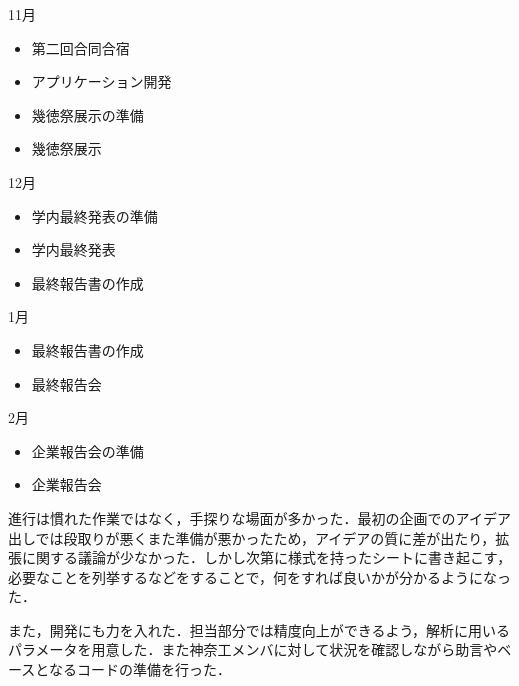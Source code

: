 11月
\begin{itemize}
\item 第二回合同合宿
\item アプリケーション開発
\item 幾徳祭展示の準備
\item 幾徳祭展示
\end{itemize}
12月
\begin{itemize}
\item 学内最終発表の準備
\item 学内最終発表
\item 最終報告書の作成
\end{itemize}
1月
\begin{itemize}
\item 最終報告書の作成
\item 最終報告会
\end{itemize}
2月
\begin{itemize}
\item 企業報告会の準備
\item 企業報告会
\end{itemize}

\par 進行は慣れた作業ではなく，手探りな場面が多かった．最初の企画でのアイデア出しでは段取りが悪くまた準備が悪かったため，アイデアの質に差が出たり，拡張に関する議論が少なかった．しかし次第に様式を持ったシートに書き起こす，必要なことを列挙するなどをすることで，何をすれば良いかが分かるようになった．
\par また，開発にも力を入れた．担当部分では精度向上ができるよう，解析に用いるパラメータを用意した．また神奈工メンバに対して状況を確認しながら助言やベースとなるコードの準備を行った．

